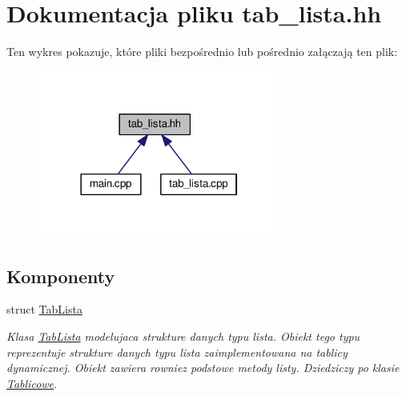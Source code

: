 \hypertarget{tab__lista_8hh}{\section{Dokumentacja pliku tab\-\_\-lista.\-hh}
\label{tab__lista_8hh}
}
Ten wykres pokazuje, które pliki bezpośrednio lub pośrednio załączają ten plik\-:\nopagebreak
\begin{figure}[H]
\begin{center}
\leavevmode
\includegraphics[width=225pt]{tab__lista_8hh__dep__incl}
\end{center}
\end{figure}
\subsection*{Komponenty}
\begin{DoxyCompactItemize}
\item 
struct \hyperlink{struct_tab_lista}{Tab\-Lista}
\begin{DoxyCompactList}\small\item\em Klasa \hyperlink{struct_tab_lista}{Tab\-Lista} modelujaca strukture danych typu lista. Obiekt tego typu reprezentuje strukture danych typu lista zaimplementowana na tablicy dynamicznej. Obiekt zawiera rowniez podstowe metody listy. Dziedziczy po klasie \hyperlink{class_tablicowe}{Tablicowe}. \end{DoxyCompactList}\end{DoxyCompactItemize}
